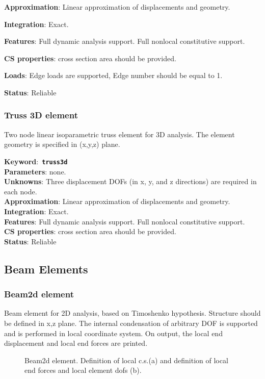\documentclass[a4paper]{article}
\newcommand{\descitem}[1]{{\noindent \bf #1}:}
\newcommand{\elemkeyword}[1]{\descitem{Keyword}~{\bf \texttt{#1}}}
\begin{document}
\descitem{Approximation} Linear approximation of displacements and geometry.

\descitem{Integration} Exact.

\descitem{Features} Full dynamic analysis support. Full nonlocal
constitutive support.

\descitem{CS properties} cross section area should be
provided.

\descitem{Loads} Edge loads are supported, Edge number should be equal
to 1.

\descitem{Status} Reliable


\subsubsection{Truss 3D element}
\label{Truss3d}

Two node linear isoparametric truss element for 3D analysis. The
element geometry is specified in (x,y,z) plane. 

\elemkeyword{truss3d}\\
\descitem{Parameters} none.\\

\descitem{Unknowns}
Three displacement DOFs (in x, y, and z directions) are required
in each node.\\
\descitem{Approximation} Linear approximation of displacements and geometry.\\
\descitem{Integration} Exact.\\
\descitem{Features} Full dynamic analysis support. Full nonlocal
constitutive support.\\
\descitem{CS properties} cross section area should be
provided.\\
\descitem{Status} Reliable



\subsection{Beam Elements}
\subsubsection{Beam2d element}
Beam element for 2D analysis, based on Timoshenko hypothesis. Structure should be defined in x,z
plane. The internal condensation
of arbitrary DOF is supported and is performed in local coordinate
system. On output, the local end displacement and local end forces are
printed. 

\begin{figure}[tb]
 \centering
 \begin{makeimage}
   
 \end{makeimage}
 \caption{Beam2d element. Definition of local c.s.(a)  and definition of
 local end forces and local element dofs (b).}
 \label{beam2dfig}
\end{figure}
\end{document}
